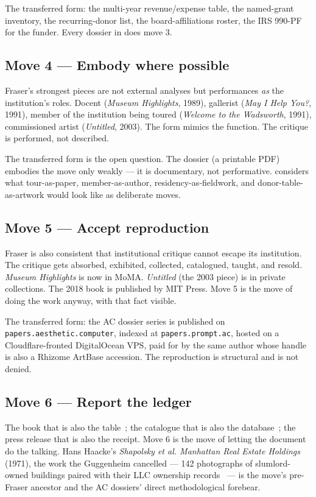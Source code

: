 \documentclass[10pt,letterpaper,twocolumn]{article}
\begin{document}
The transferred form: the multi-year revenue/expense table, the named-grant inventory, the recurring-donor list, the board-affiliations roster, the IRS 990-PF for the funder. Every dossier in  does move 3.

\subsection{Move 4 --- Embody where possible}

Fraser's strongest pieces are not external analyses but performances \emph{as} the institution's roles. Docent (\emph{Museum Highlights}, 1989), gallerist (\emph{May I Help You?}, 1991), member of the institution being toured (\emph{Welcome to the Wadsworth}, 1991), commissioned artist (\emph{Untitled}, 2003). The form mimics the function. The critique is performed, not described.

The transferred form is the open question. The dossier (a printable PDF) embodies the move only weakly --- it is documentary, not performative.  considers what tour-as-paper, member-as-author, residency-as-fieldwork, and donor-table-as-artwork would look like as deliberate moves.

\subsection{Move 5 --- Accept reproduction}

Fraser is also consistent that institutional critique cannot escape its institution. The critique gets absorbed, exhibited, collected, catalogued, taught, and resold. \emph{Museum Highlights} is now in MoMA. \emph{Untitled} (the 2003 piece) is in private collections. The 2018 book is published by MIT Press. Move 5 is the move of doing the work anyway, with that fact visible.

The transferred form: the AC dossier series is published on \texttt{papers.aesthetic.computer}, indexed at \texttt{papers.prompt.ac}, hosted on a Cloudflare-fronted DigitalOcean VPS, paid for by the same author whose handle is also a Rhizome ArtBase accession. The reproduction is structural and is not denied.

\subsection{Move 6 --- Report the ledger}

The book that is also the table~\citep{fraser2018museums}; the catalogue that is also the database~\citep{haacke1971shapolsky}; the press release that is also the receipt. Move 6 is the move of letting the document do the talking. Hans Haacke's \emph{Shapolsky et al. Manhattan Real Estate Holdings} (1971), the work the Guggenheim cancelled --- 142 photographs of slumlord-owned buildings paired with their LLC ownership records~\citep{haacke1971shapolsky} --- is the move's pre-Fraser ancestor and the AC dossiers' direct methodological forebear.
\end{document}
